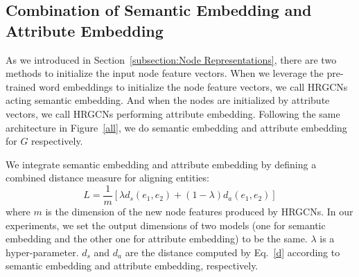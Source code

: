 	\subsection{Combination of Semantic Embedding and Attribute Embedding}
	As we introduced in Section~\ref{subsection:Node Representations}, there are two methods to initialize the input node feature vectors. 
	When we leverage the pre-trained word embeddings to initialize the node feature vectors, we call HRGCNs acting semantic embedding. 
	And when the nodes are initialized by attribute vectors, we call HRGCNs performing attribute embedding. 
	Following the same architecture in Figure~\ref{all}, we do semantic embedding and attribute embedding for $G$ respectively.
	
	We integrate semantic embedding and attribute embedding by defining a combined distance measure for aligning entities:
	\begin{equation}
		L=\frac{1}{m}[\lambda d_s(e_1,e_2)+(1-\lambda)d_a(e_1,e_2)]
	\end{equation}
	where $m$ is the dimension of the new node features produced by HRGCNs. 
	In our experiments, we set the output dimensions of two models (one for semantic embedding and the other one for attribute embedding) to be the same. 
	$\lambda$ is a hyper-parameter. $d_s$ and $d_a$ are the distance computed by Eq.~\ref{d} according to semantic embedding and attribute embedding, respectively.
	

